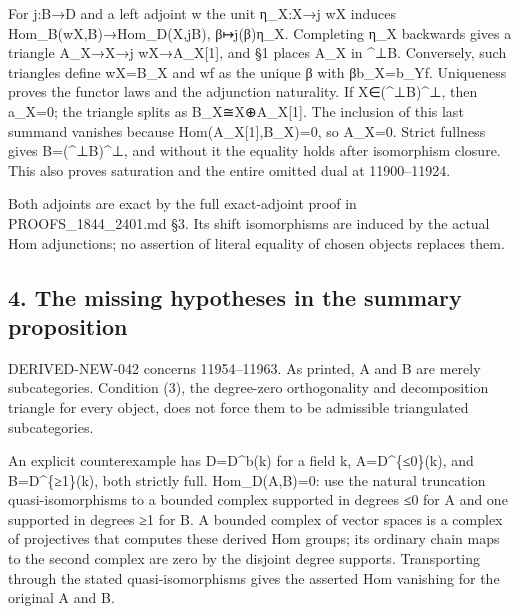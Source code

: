 For j:\allowbreak{}B\allowbreak{}→D and a left adjoint w the unit η\_\allowbreak{}X:\allowbreak{}X\allowbreak{}→j wX induces Hom\_\allowbreak{}B(wX,\allowbreak{}B)\allowbreak{}\allowbreak{}→Hom\_\allowbreak{}D(X,\allowbreak{}jB)\allowbreak{},\allowbreak{} β\allowbreak{}↦j(β)\allowbreak{}η\_\allowbreak{}X. Completing η\_\allowbreak{}X backwards gives a triangle A\_\allowbreak{}X\allowbreak{}→X\allowbreak{}→j wX\allowbreak{}→A\_\allowbreak{}X[1]\allowbreak{},\allowbreak{} and §1 places A\_\allowbreak{}X in \^{}⊥B. Conversely,\allowbreak{} such triangles define wX\allowbreak{}=B\_\allowbreak{}X and wf as the unique β with βb\_\allowbreak{}X\allowbreak{}=b\_\allowbreak{}Yf. Uniqueness proves the functor laws and the adjunction naturality. If X\allowbreak{}∈(\textasciicircum{}⊥B)\allowbreak{}\textasciicircum{}⊥,\allowbreak{} then a\_\allowbreak{}X\allowbreak{}=0; the triangle splits as B\_\allowbreak{}X≅X\allowbreak{}⊕A\_\allowbreak{}X[1]\allowbreak{}. The inclusion of this last summand vanishes because Hom(A\_\allowbreak{}X[1]\allowbreak{},\allowbreak{}B\_\allowbreak{}X)\allowbreak{}\allowbreak{}=0,\allowbreak{} so A\_\allowbreak{}X\allowbreak{}=0. Strict fullness gives B\allowbreak{}=(\textasciicircum{}⊥B)\allowbreak{}\textasciicircum{}⊥,\allowbreak{} and without it the equality holds after isomorphism closure. This also proves saturation and the entire omitted dual at 11900–\allowbreak{}11924.

Both adjoints are exact by the full exact-adjoint proof in PROOFS\_\allowbreak{}1844\_\allowbreak{}2401.md §3. Its shift isomorphisms are induced by the actual Hom adjunctions; no assertion of literal equality of chosen objects replaces them.

\subsection{4. The missing hypotheses in the summary proposition}\label{proofs-11665-12003-the-missing-hypotheses-in-the-summary-proposition}

DERIVED-NEW-042 concerns 11954–\allowbreak{}11963. As printed,\allowbreak{} A and B are merely subcategories. Condition (3)\allowbreak{},\allowbreak{} the degree-zero orthogonality and decomposition triangle for every object,\allowbreak{} does not force them to be admissible triangulated subcategories.

An explicit counterexample has D\allowbreak{}=D\textasciicircum{}b(k)\allowbreak{} for a field k,\allowbreak{} A\allowbreak{}=D\textasciicircum{}\{≤0\}(k)\allowbreak{},\allowbreak{} and B\allowbreak{}=D\textasciicircum{}\{≥1\}(k)\allowbreak{},\allowbreak{} both strictly full. Hom\_\allowbreak{}D(A,\allowbreak{}B)\allowbreak{}\allowbreak{}=0:\allowbreak{} use the natural truncation quasi-isomorphisms to a bounded complex supported in degrees ≤0 for A and one supported in degrees ≥1 for B. A bounded complex of vector spaces is a complex of projectives that computes these derived Hom groups; its ordinary chain maps to the second complex are zero by the disjoint degree supports. Transporting through the stated quasi-isomorphisms gives the asserted Hom vanishing for the original A and B.

